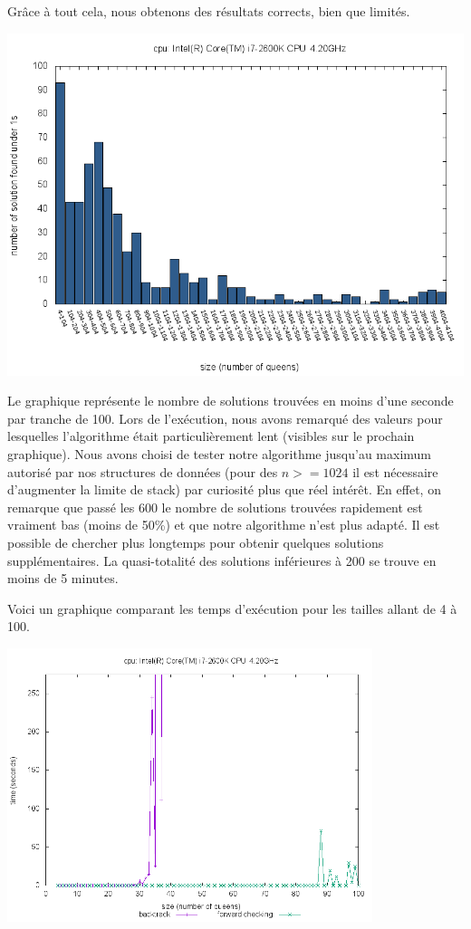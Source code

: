\documentclass[10pt,a4paper]{report}
\begin{document}
Grâce à tout cela, nous obtenons des résultats corrects, bien que limités.

\includegraphics[width=1\textwidth]{images/plot_fw_i7.png}

Le graphique représente le nombre de solutions trouvées en moins d'une seconde par tranche de 100.
Lors de l'exécution, nous avons remarqué des valeurs pour lesquelles l'algorithme était particulièrement lent (visibles sur le prochain graphique).
Nous avons choisi de tester notre algorithme jusqu'au maximum autorisé par nos structures de données (pour des $n >= 1024$ il est nécessaire d'augmenter la limite de stack) par curiosité plus que réel intérêt.
En effet, on remarque que passé les 600 le nombre de solutions trouvées rapidement est vraiment bas (moins de 50\%) et que notre algorithme n'est plus adapté.
Il est possible de chercher plus longtemps pour obtenir quelques solutions supplémentaires. La quasi-totalité des solutions inférieures à 200 se trouve en moins de 5 minutes.


Voici un graphique comparant les temps d'exécution pour les tailles allant de 4 à 100.

\includegraphics[width=0.8\textwidth]{images/plot_bt_fw_i7.png}
\end{document}
